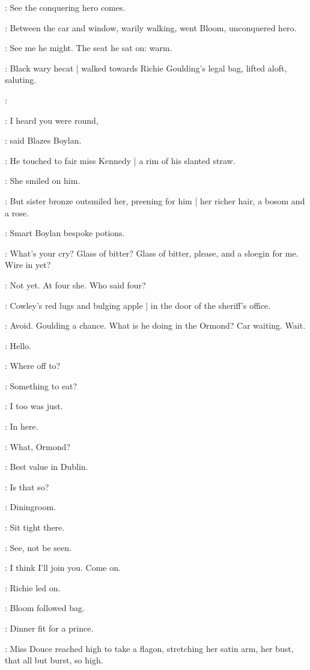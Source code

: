 \lenehan:
See the conquering hero comes.

:
Between the car and window,
warily walking,
went Bloom,
unconquered hero.

\BloomInt:
See me he might.
The seat he sat on:
warm.

:
Black wary hecat |
walked towards Richie Goulding's legal bag,
lifted aloft,
saluting.

\simon:

\boylan:
I heard you were round,

:
said Blazes Boylan.

:
He touched to fair miss Kennedy |
a rim of his slanted straw.

:
She smiled on him.

:
But sister bronze outsmiled her,
preening for him |
her richer hair,
a bosom
and a rose.

:
Smart Boylan bespoke potions.

\boylan:
What's your cry?
Glass of bitter?
Glass of bitter, please,
and a sloegin for me.
Wire in yet?

\BloomInt:
Not yet.
At four she.
Who said four?

:
Cowley's red lugs and bulging apple |
in the door of the sheriff's office.

\BloomInt:
Avoid.
Goulding a chance.
What is he doing in the Ormond?
Car waiting.
Wait.

\Bloom:
Hello.

\goulding:
Where off to?

\Bloom:
Something to eat?

\goulding:
I too was just.

\Bloom:
In here.

\goulding:
What,
Ormond?

\Bloom:
Best value in Dublin.

\goulding:
Is that so?

\Bloom:
Diningroom.

\Bloom:
Sit tight there.

\BloomInt:
See,
not be seen.

\goulding:
I think I'll join you.
Come on.

:
Richie led on.

:
Bloom followed bag.

\BloomInt:
Dinner fit for a prince.

:
Miss Douce reached high to take a flagon,
stretching her satin arm,
her bust,
that all but burst,
so high.

